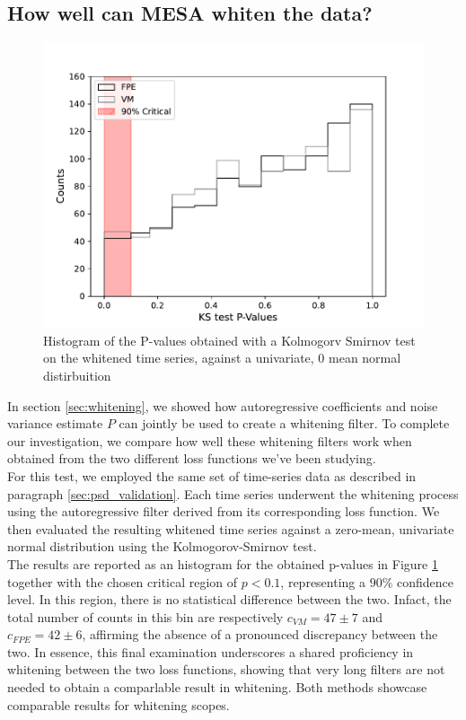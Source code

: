 \documentclass{aa}
\begin{document}
\subsection{How well can MESA whiten the data?}\label{sec:whitening_validation}
\begin{figure}
	\includegraphics[width = \linewidth]{Images/Plots/P_values_comparison}
	\caption{Histogram of the P-values obtained with a Kolmogorv Smirnov test on the whitened time series, against a univariate, 0 mean normal distirbuition}
	\label{fig:whitening}
\end{figure}
In section \ref{sec:whitening}, we showed how autoregressive coefficients and noise variance estimate $P$ can jointly be used to create a whitening filter. To complete our investigation, we compare how well these whitening filters work when obtained from the two different loss functions we've been studying. \\ 
For this test, we employed the same set of time-series data as described in paragraph \ref{sec:psd_validation}. Each time series underwent the whitening process using the autoregressive filter derived from its corresponding loss function. We then evaluated the resulting whitened time series against a zero-mean, univariate normal distribution using the Kolmogorov-Smirnov test. \\
The results are reported as an histogram for the obtained p-values in Figure \ref{fig:whitening} together with the chosen critical region of $p < 0.1$, representing a $90\%$  confidence level. In this region, there is no statistical difference between the two. Infact, the total number of counts in this bin are respectively $c_{VM} = 47 \pm 7$ and $c_{FPE} = 42 \pm 6$, affirming the absence of a pronounced discrepancy between the two.
In essence, this final examination underscores a shared proficiency in whitening between the two loss functions, showing that very long filters are not needed to obtain a comparlable result in whitening. Both methods showcase comparable results for whitening scopes.\\
\end{document}
